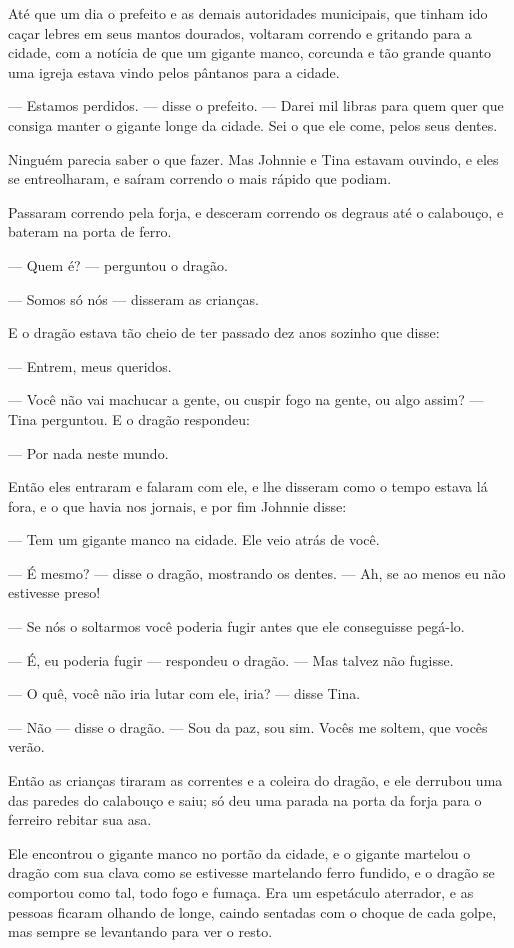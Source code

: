 Até que um dia o prefeito e as demais autoridades municipais, que
tinham ido caçar lebres em seus mantos dourados, voltaram correndo e
gritando para a cidade, com a notícia de que um gigante manco,
corcunda e tão grande quanto uma igreja estava vindo pelos pântanos
para a cidade. 

— Estamos perdidos. — disse o prefeito. — Darei mil libras para quem
quer que consiga manter o gigante longe da cidade. Sei o que ele
come, pelos seus dentes.

Ninguém parecia saber o que fazer. Mas Johnnie e Tina estavam ouvindo,
e eles se entreolharam, e saíram correndo o mais rápido que podiam. 

Passaram correndo pela forja, e desceram correndo os degraus até o
calabouço, e bateram na porta de ferro. 

— Quem é? — perguntou o dragão.

— Somos só nós — disseram as crianças.

E o dragão estava tão cheio de ter passado dez anos sozinho que disse:

— Entrem, meus queridos.

— Você não vai machucar a gente, ou cuspir fogo na gente, ou algo
assim? — Tina perguntou. E o dragão respondeu:

— Por nada neste mundo.

Então eles entraram e falaram com ele, e lhe disseram como o tempo
estava lá fora, e o que havia nos jornais, e por fim Johnnie disse:

— Tem um gigante manco na cidade. Ele veio atrás de você.

— É mesmo? — disse o dragão, mostrando os dentes. — Ah, se ao menos eu
não estivesse preso!

— Se nós o soltarmos você poderia fugir antes que ele conseguisse
pegá-lo.

— É, eu poderia fugir — respondeu o dragão. — Mas talvez não fugisse.

— O quê, você não iria lutar com ele, iria? — disse Tina.

— Não — disse o dragão. — Sou da paz, sou sim. Vocês me soltem, que
vocês verão. 

Então as crianças tiraram as correntes e a coleira do dragão, e ele
derrubou uma das paredes do calabouço e saiu; só deu uma parada na
porta da forja para o ferreiro rebitar sua asa.

Ele encontrou o gigante manco no portão da cidade, e o gigante
martelou o dragão com sua clava como se estivesse martelando ferro
fundido, e o dragão se comportou como tal, todo fogo e fumaça. Era um
espetáculo aterrador, e as pessoas ficaram olhando de longe, caindo
sentadas com o choque de cada golpe, mas sempre se levantando para
ver o resto.


